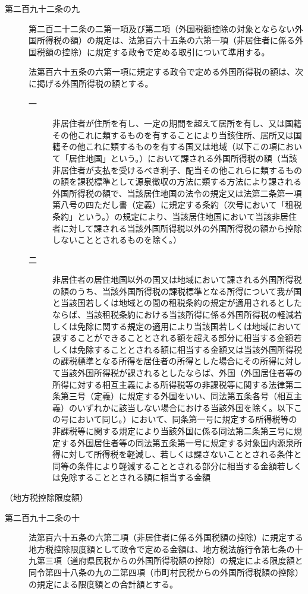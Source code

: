 \documentclass[twocolumn,a4j,10pt]{ltjtarticle}
\begin{document}
\begin{description}
\item[第二百九十二条の九]第二百二十二条の二第一項及び第二項（外国税額控除の対象とならない外国所得税の額）の規定は、法第百六十五条の六第一項（非居住者に係る外国税額の控除）に規定する政令で定める取引について準用する。
\item[]法第百六十五条の六第一項に規定する政令で定める外国所得税の額は、次に掲げる外国所得税の額とする。
\begin{description}
\item[一]非居住者が住所を有し、一定の期間を超えて居所を有し、又は国籍その他これに類するものを有することにより当該住所、居所又は国籍その他これに類するものを有する国又は地域（以下この項において「居住地国」という。）において課される外国所得税の額（当該非居住者が支払を受けるべき利子、配当その他これらに類するものの額を課税標準として源泉徴収の方法に類する方法により課される外国所得税の額で、当該居住地国の法令の規定又は法第二条第一項第八号の四ただし書（定義）に規定する条約（次号において「租税条約」という。）の規定により、当該居住地国において当該非居住者に対して課される当該外国所得税以外の外国所得税の額から控除しないこととされるものを除く。）
\item[二]非居住者の居住地国以外の国又は地域において課される外国所得税の額のうち、当該外国所得税の課税標準となる所得について我が国と当該国若しくは地域との間の租税条約の規定が適用されるとしたならば、当該租税条約における当該所得に係る外国所得税の軽減若しくは免除に関する規定の適用により当該国若しくは地域において課することができることとされる額を超える部分に相当する金額若しくは免除することとされる額に相当する金額又は当該外国所得税の課税標準となる所得を居住者の所得とした場合にその所得に対して当該外国所得税が課されるとしたならば、外国（外国居住者等の所得に対する相互主義による所得税等の非課税等に関する法律第二条第三号（定義）に規定する外国をいい、同法第五条各号（相互主義）のいずれかに該当しない場合における当該外国を除く。以下この号において同じ。）において、同条第一号に規定する所得税等の非課税等に関する規定により当該外国に係る同法第二条第三号に規定する外国居住者等の同法第五条第一号に規定する対象国内源泉所得に対して所得税を軽減し、若しくは課さないこととされる条件と同等の条件により軽減することとされる部分に相当する金額若しくは免除することとされる額に相当する金額
\end{description}
\end{description}
\noindent\hspace{10pt}（地方税控除限度額）
\begin{description}
\item[第二百九十二条の十]法第百六十五条の六第二項（非居住者に係る外国税額の控除）に規定する地方税控除限度額として政令で定める金額は、地方税法施行令第七条の十九第三項（道府県民税からの外国所得税額の控除）の規定による限度額と同令第四十八条の九の二第四項（市町村民税からの外国所得税額の控除）の規定による限度額との合計額とする。
\end{description}
\end{document}
